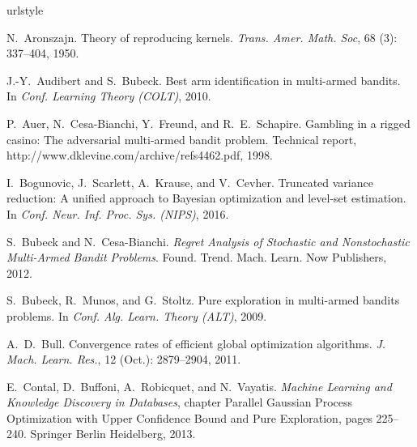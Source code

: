 \documentclass[english,onecolumn,final,11pt]{IEEEtran} %
\begin{document}
\begin{thebibliography}{23}
\providecommand{\natexlab}[1]{#1}
\providecommand{\url}[1]{\texttt{#1}}
\expandafter\ifx\csname urlstyle\endcsname\relax
  \providecommand{\doi}[1]{doi: #1}\else
  \providecommand{\doi}{doi: \begingroup \urlstyle{rm}\Url}\fi

N.~Aronszajn.
\newblock Theory of reproducing kernels.
\newblock \emph{Trans. Amer. Math. Soc}, 68 (3): 337--404,
  1950.

J.-Y.~Audibert and S.~Bubeck.
\newblock Best arm identification in multi-armed bandits.
\newblock In \emph{Conf. Learning Theory (COLT)}, 2010.

P.~Auer, N.~Cesa-Bianchi, Y.~Freund, and R.~E.~Schapire.
\newblock Gambling in a rigged casino: The adversarial multi-armed bandit
  problem.
\newblock Technical report, http://www.dklevine.com/archive/refs4462.pdf, 1998.

I.~Bogunovic, J.~Scarlett, A.~Krause, and V.~Cevher.
\newblock Truncated variance reduction: A unified approach to {B}ayesian
  optimization and level-set estimation.
\newblock In \emph{Conf. Neur. Inf. Proc. Sys. (NIPS)}, 2016.

S.~Bubeck and N.~Cesa-Bianchi.
\newblock \emph{Regret Analysis of Stochastic and Nonstochastic Multi-Armed
  Bandit Problems}.
\newblock Found. Trend. Mach. Learn. Now Publishers, 2012.

S.~Bubeck, R.~Munos, and G.~Stoltz.
\newblock Pure exploration in multi-armed bandits problems.
\newblock In \emph{Conf. Alg. Learn. Theory (ALT)}, 2009.

A.~D.~Bull.
\newblock Convergence rates of efficient global optimization algorithms.
\newblock \emph{J. Mach. Learn. Res.}, 12 (Oct.): 2879--2904,
  2011.

E.~Contal, D.~Buffoni, A.~Robicquet, and N.~Vayatis.
\newblock \emph{Machine Learning and Knowledge Discovery in Databases}, chapter
  Parallel {G}aussian Process Optimization with Upper Confidence Bound and Pure
  Exploration, pages 225--240.
\newblock Springer Berlin Heidelberg, 2013.


\end{thebibliography}
\end{document}
